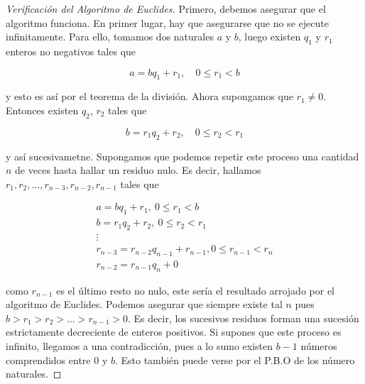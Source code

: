 \begin{proof}[Verificación del Algoritmo de Euclides]
    Primero, debemos asegurar que el algoritmo funciona. En primer lugar, hay que asegurarse que no se ejecute infinitamente. Para ello, tomamos dos naturales $a$ y $b$, luego existen $q_1$ y $r_1$ enteros no negativos tales que
    
    \[
    a = bq_1 + r_1, \quad 0 \leq r_1 < b
    \]
    
    \noindent y esto es así por el teorema de la división. Ahora supongamos que $r_1 \neq 0$. Entonces existen $q_2$, $r_2$ tales que
    
    \[
    b = r_1q_2 + r_2, \quad 0 \leq r_2 < r_1
    \]
    
    \noindent y así sucesivametne. Supongamos que podemos repetir este proceso una cantidad $n$ de veces hasta hallar un residuo nulo. Es decir, hallamos $r_1, r_2, \dots, r_{n-3}, r_{n-2}, r_{n-1}$ tales que
    
    \begin{gather*}
        a = bq_1 + r_1, \ 0 \leq r_1 < b \\
        b = r_1q_2 + r_2, \ 0 \leq r_2 < r_1 \\
        \vdots \\
        r_{n-3} = r_{n-2}q_{n-1} + r_{n-1}, 0 \leq r_{n-1} < r_n \\
        r_{n-2} = r_{n-1}q_n + 0
    \end{gather*}
    
    \noindent como $r_{n-1}$ es el último resto no nulo, este sería el resultado arrojado por el algoritmo de Euclides. Podemos asegurar que siempre existe tal $n$ pues $b > r_1 > r_2 > \dots > r_{n-1} > 0$. Es decir, los sucesivos residuos forman una sucesión estrictamente decreciente de enteros positivos. Si supones que este proceso es infinito, llegamos a una contradicción, pues a lo sumo existen $b-1$ números comprendidos entre $0$ y $b$. Esto también puede verse por el P.B.O de los número naturales.
    

\end{proof}
